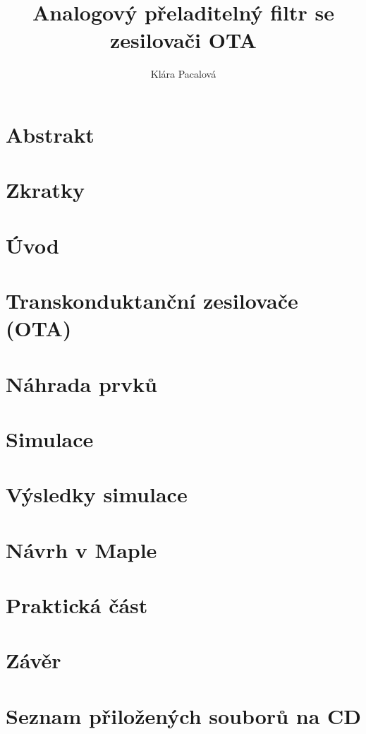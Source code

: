 \documentclass[twoside]{article}
\newcommand{\sekce}[1]{\clearpage \section{#1}}
\newcommand{\nadpis}[1]{\newpage \section*{#1}}
\begin{document}
\title{Analogový přeladitelný filtr se zesilovači OTA}
\author{Klára Pacalová}


\fancyhf[HC]{\bfseries\leftmark}


\thispagestyle{empty} 
\nadpis{}

\thispagestyle{empty} 
\nadpis{}

\thispagestyle{empty} 
\nadpis{Abstrakt}

\renewcommand{\headrulewidth}{0.5pt}

\nadpis{Zkratky}


{
\hypersetup{hidelinks}
\newpage
\tableofcontents
\newpage
\listoffigures
\newpage
\listoftables
}

\sekce{Úvod}

\sekce{Transkonduktanční zesilovače (OTA)}
\label{s:OTA}
\sekce{Náhrada prvků}\label{s:NAH}

\sekce{Simulace}

\sekce{Výsledky simulace}

\sekce{Návrh v Maple}\label{s:MAPLE}

\sekce{Praktická část}\label{s:PRAK}

\sekce{Závěr}


\renewcommand{\headrulewidth}{0pt}
\fancyhf{}
\nadpis{Seznam přiložených souborů na CD}

\end{document}
